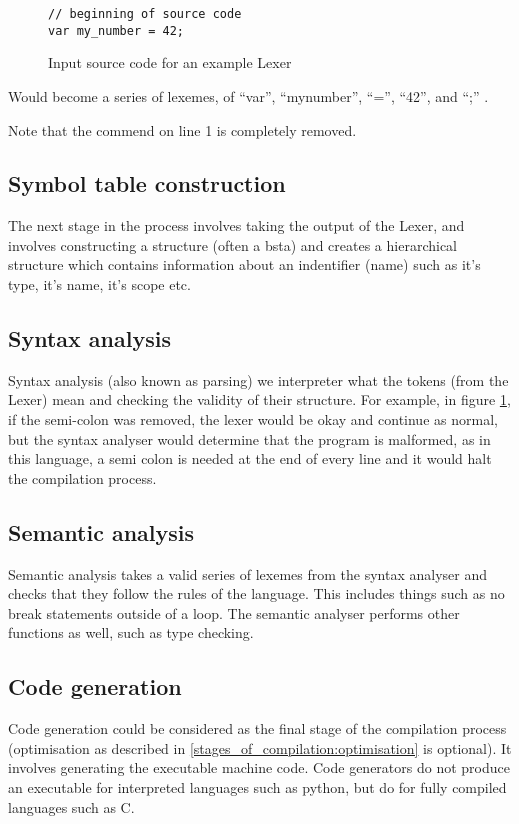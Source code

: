 \documentclass{article}
\begin{document}
\begin{figure}[H]
	\begin{lstlisting}
// beginning of source code
var my_number = 42;
 	\end{lstlisting}
	\caption{Input source code for an example Lexer}
	\label{fig:code:pre-lexer}
\end{figure}

Would become a series of lexemes, of ``var'', ``my\textunderscore number'', ``='', ``42'', and ``;'' \parencite{crafting_interpreters}.

Note that the commend on line 1 is completely removed.

\subsection{Symbol table construction}
The next stage in the process involves taking the output of the Lexer, and involves constructing a structure (often a \gls{bsta}) and creates a hierarchical structure which contains information about an indentifier (name) such as it's type, it's name, it's scope etc.
\subsection{Syntax analysis}
Syntax analysis (also known as parsing) we interpreter what the tokens (from the Lexer) mean and checking the validity of their structure. For example, in figure \ref{fig:code:pre-lexer}, if the semi-colon was removed, the lexer would be okay and continue as normal, but the syntax analyser would determine that the program is malformed, as in this language, a semi colon is needed at the end of every line and it would halt the compilation process.
\subsection{Semantic analysis}
Semantic analysis takes a valid series of lexemes from the syntax analyser and checks that they follow the rules of the language. This includes things such as no break statements outside of a loop. The semantic analyser performs other functions as well, such as type checking.

\subsection{Code generation}
Code generation could be considered as the final stage of the compilation process (optimisation as described in \ref{stages_of_compilation:optimisation} is optional). It involves generating the executable machine code. Code generators do not produce an executable for interpreted languages such as python, but do for fully compiled languages such as C.
\end{document}
